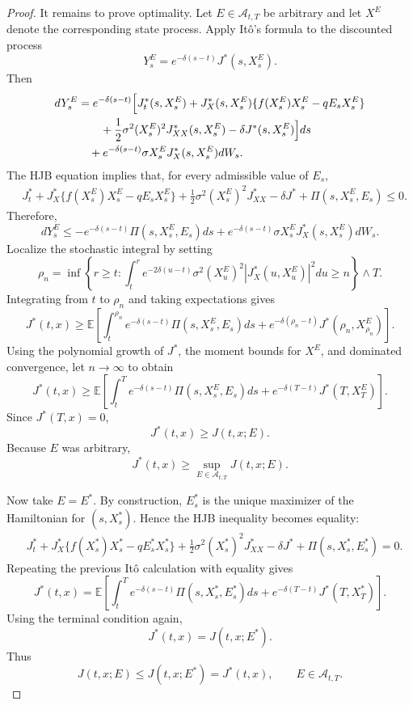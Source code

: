 \documentclass[10pt,a4paper]{amsart}
\begin{document}
\begin{proof}
		It remains to prove optimality. Let $E\in\mathcal{A}_{t,T}$ be arbitrary and let $X^E$ denote the corresponding state process. Apply It\^o's formula to the discounted process
		\[
		Y_s^E=e^{-\delta(s-t)}J^*(s,X_s^E).
		\]
		Then
		\[
		\begin{aligned}
			dY_s^E
			&=
			e^{-\delta(s-t)}
			\Bigl[
			J_t^*(s,X_s^E)
			+
			J_X^*(s,X_s^E)
			\{f(X_s^E)X_s^E-qE_sX_s^E\}
			\\
			&\qquad
			+
			\frac12\sigma^2(X_s^E)^2J_{XX}^*(s,X_s^E)
			-
			\delta J^*(s,X_s^E)
			\Bigr]ds
			\\
			&\quad
			+
			e^{-\delta(s-t)}
			\sigma X_s^EJ_X^*(s,X_s^E)dW_s .
		\end{aligned}
		\]
		The HJB equation implies that, for every admissible value of $E_s$,
		\[
		\begin{aligned}
			&J_t^*
			+
			J_X^*
			\{f(X_s^E)X_s^E-qE_sX_s^E\}
			+
			\frac12\sigma^2(X_s^E)^2J_{XX}^*
			-
			\delta J^*
			+
			\Pi(s,X_s^E,E_s)
			\le0.
		\end{aligned}
		\]
		Therefore,
		\[
		dY_s^E
		\le
		-e^{-\delta(s-t)}
		\Pi(s,X_s^E,E_s)ds
		+
		e^{-\delta(s-t)}
		\sigma X_s^EJ_X^*(s,X_s^E)dW_s .
		\]
		Localize the stochastic integral by setting
		\[
		\rho_n
		=
		\inf
		\left\{
		r\ge t:
		\int_t^r
		e^{-2\delta(u-t)}
		\sigma^2(X_u^E)^2
		|J_X^*(u,X_u^E)|^2du
		\ge n
		\right\}
		\wedge T.
		\]
		Integrating from $t$ to $\rho_n$ and taking expectations gives
		\[
		J^*(t,x)
		\ge
		\mathbb{E}
		\left[
		\int_t^{\rho_n}
		e^{-\delta(s-t)}
		\Pi(s,X_s^E,E_s)ds
		+
		e^{-\delta(\rho_n-t)}
		J^*(\rho_n,X_{\rho_n}^E)
		\right].
		\]
		Using the polynomial growth of $J^*$, the moment bounds for $X^E$, and dominated convergence, let $n\to\infty$ to obtain
		\[
		J^*(t,x)
		\ge
		\mathbb{E}
		\left[
		\int_t^T
		e^{-\delta(s-t)}
		\Pi(s,X_s^E,E_s)ds
		+
		e^{-\delta(T-t)}
		J^*(T,X_T^E)
		\right].
		\]
		Since $J^*(T,x)=0$,
		\[
		J^*(t,x)
		\ge
		J(t,x;E).
		\]
		Because $E$ was arbitrary,
		\[
		J^*(t,x)\ge \sup_{E\in\mathcal{A}_{t,T}}J(t,x;E).
		\]
		
		Now take $E=E^*$. By construction, $E_s^*$ is the unique maximizer of the Hamiltonian for $(s,X_s^*)$. Hence the HJB inequality becomes equality:
		\[
		\begin{aligned}
			&J_t^*
			+
			J_X^*
			\{f(X_s^*)X_s^*-qE_s^*X_s^*\}
			+
			\frac12\sigma^2(X_s^*)^2J_{XX}^*
			-
			\delta J^*
			+
			\Pi(s,X_s^*,E_s^*)
			=
			0.
		\end{aligned}
		\]
		Repeating the previous It\^o calculation with equality gives
		\[
		J^*(t,x)
		=
		\mathbb{E}
		\left[
		\int_t^T
		e^{-\delta(s-t)}
		\Pi(s,X_s^*,E_s^*)ds
		+
		e^{-\delta(T-t)}
		J^*(T,X_T^*)
		\right].
		\]
		Using the terminal condition again,
		\[
		J^*(t,x)
		=
		J(t,x;E^*).
		\]
		Thus
		\[
		J(t,x;E)\le J(t,x;E^*)=J^*(t,x),
		\qquad
		E\in\mathcal{A}_{t,T}.
		\]
		

\end{proof}
\end{document}
